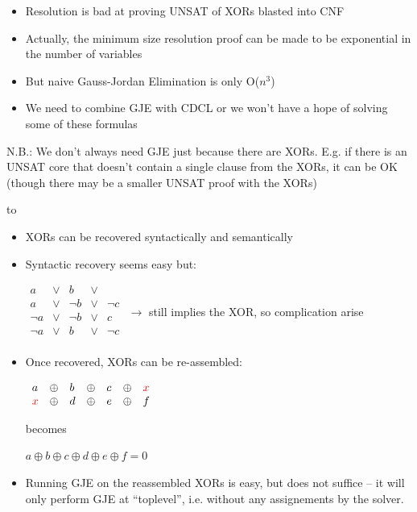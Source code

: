 \documentclass[aspectratio=196]{slides}
\def\TITLE#1{\hbox to \linewidth{\large #1\hfill}}
\def\BOTTOM{\vfill\newpage}
\def\SLIDE#1{\BOTTOM\TITLE{#1}}
\begin{document}
\begin{itemize}
\item Resolution is bad at proving UNSAT of XORs blasted into CNF
\item Actually, the minimum size resolution proof can be made to be exponential in the number of variables
\item But naive Gauss-Jordan Elimination is only O($n^3$)
\item We need to combine GJE with CDCL or we won't have a hope of solving some of these formulas
\end{itemize}

N.B.: We don't always need GJE just because there are XORs. E.g. if there is an UNSAT core that doesn't contain a single clause from the XORs, it can be OK (though there may be a smaller UNSAT proof with the XORs)


\vfill
\newpage

\SLIDE{XOR manipulation once in CNF format}

\begin{itemize}
\item XORs can be recovered syntactically and semantically
\item Syntactic recovery seems easy but:

$\begin{array}{lllll}
a& \vee &b& \vee\\
a& \vee &\neg b& \vee &\neg c\\
\neg a& \vee &\neg b& \vee &c\\
\neg a& \vee &b& \vee &\neg c\\
\end{array}$
$\rightarrow$ still implies the XOR, so complication arise
\item Once recovered, XORs can be re-assembled:

$\begin{array}{lllllll}
a& \oplus &b& \oplus &c & \oplus &{\color{red}x}\\
{\color{red}x}& \oplus &d& \oplus &e & \oplus &f\\
\end{array}$

becomes

$a\oplus b\oplus c\oplus d\oplus e\oplus f=0$



\item Running GJE on the reassembled XORs is easy, but does not suffice -- it will only perform GJE at ``toplevel'', i.e. without any assignements by the solver.
\end{itemize}
\end{document}
